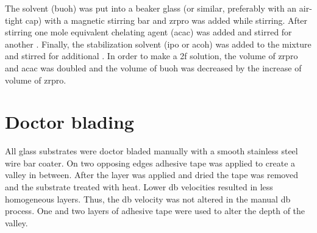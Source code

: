 The solvent (\gls{buoh}) was put into a beaker glass (or similar, preferably with an 
air-tight cap) with a magnetic stirring bar and \gls{zrpro} was added while stirring. After 
stirring  one mole equivalent chelating agent (\gls{acac}) was 
added and stirred for another . Finally, the stabilization 
solvent\cite{Hu2016} (\gls{ipo} or \gls{acoh}) was added to the mixture and stirred for 
additional . 
In order to make a \gls{2f} solution, the volume of \gls{zrpro} and \gls{acac} was 
doubled and the volume of \gls{buoh} was decreased by the increase of volume of \gls{zrpro}. 

\section{Doctor blading}
\label{sec:exp-db}
All glass substrates were doctor bladed manually with a smooth stainless steel wire bar 
coater. On two opposing edges adhesive tape was applied to create a valley in between. After the 
layer was applied and dried the tape was removed and the substrate treated with heat.
Lower \gls{db} velocities resulted in less homogeneous layers.
Thus, the \gls{db} velocity was not altered in the manual \gls{db} process. 
One and two layers of adhesive tape were used to alter the depth of the valley. 

